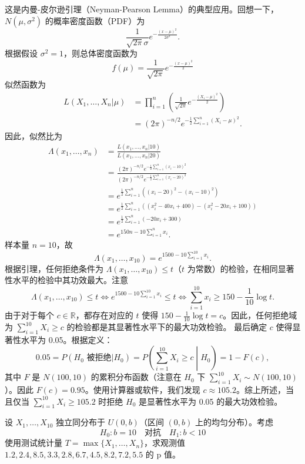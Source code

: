 \begin{questions}
\begin{solution}
这是内曼-皮尔逊引理（Neyman-Pearson Lemma）的典型应用。回想一下，$N(\mu, \sigma^2)$ 的概率密度函数（PDF）为
\[
\frac{1}{\sqrt{2\pi}\sigma} e^{-\frac{(x-\mu)^2}{2\sigma^2}}.
\]
根据假设 $\sigma^2 = 1$，则总体密度函数为
\[
f(\mu) = \frac{1}{\sqrt{2\pi}} e^{-\frac{(x-\mu)^2}{2}}
\]
似然函数为
\begin{align*}
L(X_1, \dots, X_n | \mu) &= \prod_{i=1}^n \left( \frac{1}{\sqrt{2\pi}} e^{-\frac{(X_i-\mu)^2}{2}} \right) \\
&= (2\pi)^{-n/2} e^{-\frac{1}{2} \sum_{i=1}^n (X_i-\mu)^2}.
\end{align*}
因此，似然比为
\begin{align*}
\Lambda(x_1, \dots, x_n) &= \frac{L(x_1, \dots, x_n | 10)}{L(x_1, \dots, x_n | 20)} \\
&= \frac{(2\pi)^{-n/2} e^{-\frac{1}{2} \sum_{i=1}^n (x_i-10)^2}}{(2\pi)^{-n/2} e^{-\frac{1}{2} \sum_{i=1}^n (x_i-20)^2}} \\
&= e^{\frac{1}{2} \sum_{i=1}^n \left( (x_i-20)^2 - (x_i-10)^2 \right)} \\
&= e^{\frac{1}{2} \sum_{i=1}^n \left( (x_i^2 - 40x_i + 400) - (x_i^2 - 20x_i + 100) \right)} \\
&= e^{\frac{1}{2} \sum_{i=1}^n (-20x_i + 300)} \\
&= e^{150n - 10 \sum_{i=1}^n x_i}.
\end{align*}
样本量 $n=10$，故
\[
\Lambda(x_1, \dots, x_{10}) = e^{1500 - 10 \sum_{i=1}^{10} x_i}.
\]
根据引理，任何拒绝条件为 $\Lambda(x_1, \dots, x_{10}) \le t$（$t$ 为常数）的检验，在相同显著性水平的检验中其功效最大。注意
\[
\Lambda(x_1, \dots, x_{10}) \le t \iff e^{1500 - 10 \sum_{i=1}^{10} x_i} \le t \iff \sum_{i=1}^{10} x_i \ge 150 - \frac{1}{10} \log t.
\]
由于对于每个 $c \in \mathbb{R}$，都存在对应的 $t$ 使得 $150 - \frac{1}{10} \log t = c$。因此，任何拒绝域为 $\sum_{i=1}^{10} X_i \ge c$ 的检验都是其显著性水平下的最大功效检验。
最后确定 $c$ 使得显著性水平为 0.05。根据定义：
\[
0.05 = P(H_0 \text{ 被拒绝} | H_0) = P\left( \sum_{i=1}^{10} X_i \ge c \middle| H_0 \right) = 1 - F(c),
\]
其中 $F$ 是 $N(100, 10)$ 的累积分布函数（注意在 $H_0$ 下 $\sum_{i=1}^{10} X_i \sim N(100, 10)$）。因此 $F(c) = 0.95$。使用计算器或软件，我们发现 $c \approx 105.2$。综上所述，当且仅当 $\sum_{i=1}^{10} X_i \ge 105.2$ 时拒绝 $H_0$ 是显著性水平为 0.05 的最大功效检验。
\end{solution}

\question 设 $X_1, \dots, X_{10}$ 独立同分布于 $U(0, b)$（区间 $(0, b)$ 上的均匀分布）。考虑
\[
H_0 : b = 10 \quad \text{对抗} \quad H_1 : b < 10
\]
使用测试统计量 $T = \max\{X_1, \dots, X_n\}$，求观测值 $1.2, 2.4, 8.5, 3.3, 2.8, 6.7, 4.5, 8.2, 7.2, 5.5$ 的 p 值。


\end{questions}
